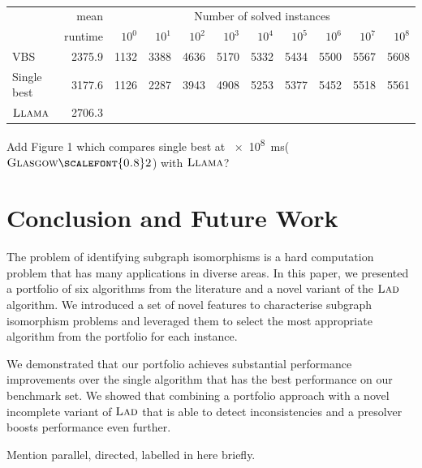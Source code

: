 \documentclass{llncs}
\newcommand{\LAD}{$\textsc{Lad}$\xspace}
\newcommand{\GlasgowTwo}{$\textsc{Glasgow{\scalefont{0.8}2}}$\xspace}
\newcommand{\LLAMA}{$\textsc{Llama}$\xspace}
\begin{document}
\begin{table}
\begin{tabular}{|l|r|rrrrrrrrr|}
&mean & \multicolumn{9}{c|}{Number of solved instances}\\
&runtime & $10^0$ &  $10^1$ &  $10^2$ &  $10^3$ &  $10^4$ &  $10^5$ &  $10^6$ &  $10^7$ &  $10^8$\\\hline
VBS & 2375.9 & 1132 & 3388 & 4636 & 5170 & 5332 & 5434 & 5500 & 5567 & 5608\\\hline
Single best & 3177.6 & 1126 & 2287 & 3943 & 4908 & 5253 & 5377 & 5452 & 5518 & 5561\\\hline
\LLAMA & 2706.3\\\hline
\end{tabular}
\caption{}\label{selectionvsvbs}
\end{table}

Add Figure 1 which compares single best at \SI{e8}{\ms}(\GlasgowTwo) with \LLAMA ?

\section{Conclusion and Future Work}

The problem of identifying subgraph isomorphisms is a hard computation problem
that has many applications in diverse areas. In this paper, we presented a
portfolio of six algorithms from the literature and a novel variant of the \LAD
algorithm. We introduced a set of novel features to characterise subgraph
isomorphism problems and leveraged them to select the most appropriate algorithm
from the portfolio for each instance.

We demonstrated that our portfolio achieves substantial performance improvements
over the single algorithm that has the best performance on our benchmark set. We
showed that combining a portfolio approach with a novel incomplete variant of
\LAD that is able to detect inconsistencies and a presolver boosts performance
even further.

Mention parallel, directed, labelled in here briefly.



\end{document}
